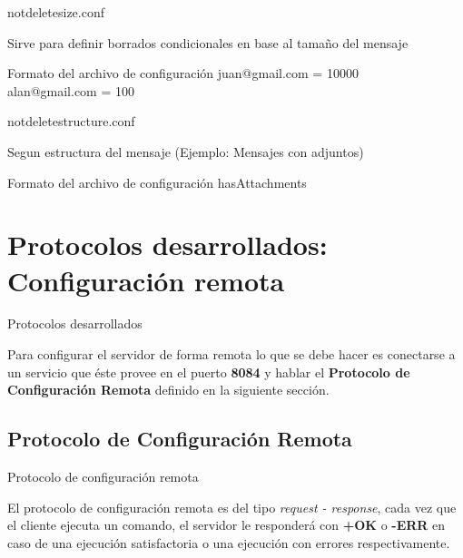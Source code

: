 \documentclass{beamer}
\begin{document}
\begin{frame}{notdelete\textunderscore size.conf}

\par Sirve para definir borrados condicionales en base al tamaño del mensaje\\[0.5cm]

\begin{block}{Formato del archivo de configuración}
juan@gmail.com = 10000\\
alan@gmail.com = 100\\
\end{block}

\end{frame}

\begin{frame}{notdelete\textunderscore structure.conf}

\par Segun estructura del mensaje (Ejemplo: Mensajes con adjuntos)\\[0.5cm]

\begin{block}{Formato del archivo de configuración}
hasAttachments\\
\end{block}

\end{frame}

\section{Protocolos desarrollados: Configuración remota}

\begin{frame}{Protocolos desarrollados}

\par Para configurar el servidor de forma remota lo que se debe hacer es conectarse a un servicio que éste provee en el puerto \textbf{8084} y hablar el \textbf{Protocolo de Configuración Remota} definido en la siguiente sección.

\end{frame}

\subsection{Protocolo de Configuración Remota}

\begin{frame}{Protocolo de configuración remota}

\par El protocolo de configuración remota es del tipo \textit{request - response}, cada vez que el cliente ejecuta un comando, el servidor le responderá con \textbf{+OK} o \textbf{-ERR} en caso de una ejecución satisfactoria o una ejecución con errores respectivamente.

\end{frame}
\end{document}
